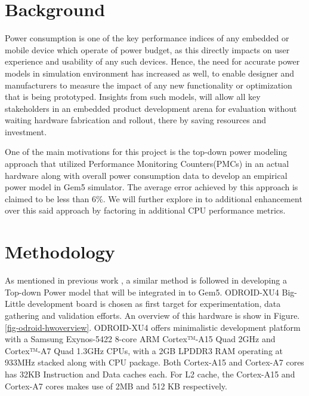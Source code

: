 \documentclass[conference]{IEEEtran}
\begin{document}
\section{Background}
    \par Power consumption is one of the key performance indices of any embedded or mobile device which operate of power budget, as this directly impacts on user experience and usability of any such devices. Hence, the need for accurate power models in simulation environment has increased as well, to enable designer and manufacturers to measure the impact of any new functionality or optimization that is being prototyped. Insights from such models, will allow all key stakeholders in an embedded product development arena for evaluation without waiting hardware fabrication and rollout, there by saving resources and investment.

    \par One of the main motivations for this project is the top-down power modeling approach\cite{Reddy2017EmpiricalCP} that utilized Performance Monitoring Counters(PMCs) in an actual hardware along with overall power consumption data to develop an empirical power model in Gem5 simulator\cite{8718630}. The average error achieved by this approach is claimed to be less than 6\%. We will further explore in to additional enhancement over this said approach by factoring in additional CPU performance metrics.
    \medbreak
\section{Methodology}
    \par As mentioned in previous work \cite{Reddy2017EmpiricalCP}, a similar method is followed in developing a Top-down Power model that will be integrated in to Gem5. ODROID-XU4\cite{odroid-xu4} Big-Little development board is chosen as first target for experimentation, data gathering and validation efforts. An overview of this hardware is show in Figure. \ref{fig-odroid-hwoverview}. ODROID-XU4 offers minimalistic development platform with a Samsung Exynos-5422 8-core ARM Cortex™-A15 Quad 2GHz and Cortex™-A7 Quad 1.3GHz CPUs, with a 2GB LPDDR3 RAM operating at 933MHz stacked along with CPU package. Both Cortex-A15 and Cortex-A7 cores has 32KB Instruction and Data caches each. For L2 cache, the Cortex-A15 and Cortex-A7 cores makes use of 2MB and 512 KB respectively.
\end{document}
